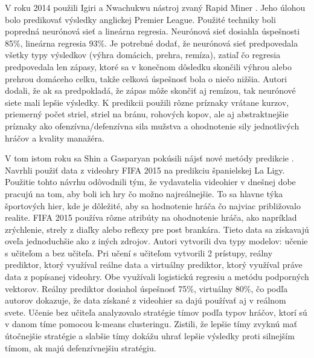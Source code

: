 V roku 2014 použili Igiri a Nwachukwu nástroj zvaný Rapid Miner \citep{related:igiri}. 
Jeho úlohou bolo predikovať výsledky anglickej Premier League. 
Použité techniky boli popredná neurónová sieť a lineárna regresia. 
Neurónová sieť dosiahla úspešnosti 85\%, lineárna regresia 93\%. 
Je potrebné dodať, že neurónová sieť predpovedala všetky typy výsledkov (výhra domácich, prehra, remíza), zatiaľ čo regresia predpovedala len zápasy, ktoré sa v konečnom dôsledku skončili výhrou alebo prehrou domáceho celku, takže celková úspešnosť bola o niečo nižšia. 
Autori dodali, že ak sa predpokladá, že zápas môže skončiť aj remízou, tak neurónové siete mali lepšie výsledky. 
K predikcii použili rôzne príznaky vrátane kurzov, priemerný počet striel, striel na bránu, rohových kopov, ale aj abstraktnejšie príznaky ako ofenzívna/defenzívna sila mužstva a ohodnotenie sily jednotlivých hráčov a kvality manažéra.

V tom istom roku sa Shin a Gasparyan pokúsili nájsť nové metódy predikcie \citep{related:shin}. 
Navrhli použiť data z videohry FIFA 2015 na pre\-dik\-ciu španielskej La Ligy.
Použitie tohto návrhu odôvodnili tým, že vydavatelia videohier v dnešnej dobe pracujú na tom, aby boli ich hry čo možno najreálnejšie.
To sa hlavne týka športových hier, kde je dôležité, aby sa hodnotenie hráča čo najviac približovalo realite.
FIFA 2015 používa rôzne atribúty na ohodnotenie hráča, ako napríklad zrýchlenie, strely z diaľky alebo reflexy pre post brankára.
Tieto data sa získavajú oveľa jednoduchšie ako z iných zdrojov.
Autori vytvorili dva typy modelov: učenie s učiteľom a bez učiteľa.
Pri učení s učiteľom vytvorili 2 prístupy, reálny prediktor, ktorý využíval reálne data a virtuálny prediktor, ktorý využíval práve data z popísanej videohry.
Obe využívali logistickú regresiu a metódu podporných vektorov.
Reálny prediktor dosiahol úspešnosť 75\%, virtuálny 80\%, čo podľa autorov dokazuje, že data získané z videohier sa dajú používať aj v reálnom svete.
Učenie bez učiteľa analyzovalo stratégie tímov podľa typov hráčov, ktorí sú v danom tíme pomocou k-means clusteringu. Zistili, že lepšie tímy zvyknú mať útočnejšie stratégie a slabšie tímy dokážu uhrať lepšie výsledky proti silnejším tímom, ak majú defenzívnejšiu stratégiu.

